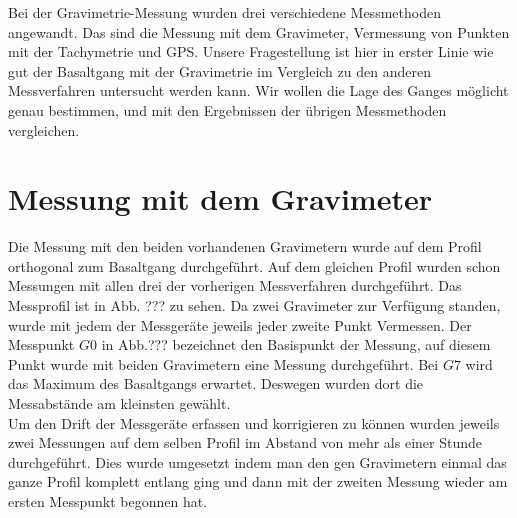 
Bei der Gravimetrie-Messung wurden drei verschiedene Messmethoden angewandt. Das sind die Messung mit dem Gravimeter, Vermessung von Punkten mit der Tachymetrie und GPS.
Unsere Fragestellung ist hier in erster Linie wie gut der Basaltgang mit der Gravimetrie im Vergleich zu den anderen Messverfahren untersucht werden kann.  Wir wollen die Lage des Ganges möglicht genau bestimmen, und mit den 
Ergebnissen der übrigen Messmethoden vergleichen.

\section{Messung mit dem Gravimeter}
Die Messung mit den beiden vorhandenen Gravimetern wurde auf dem Profil orthogonal zum Basaltgang durchgeführt. Auf dem gleichen Profil wurden schon Messungen mit allen drei der vorherigen Messverfahren durchgeführt.
Das Messprofil ist in Abb. ??? zu sehen. Da zwei Gravimeter zur Verfügung standen, wurde mit jedem der Messgeräte jeweils jeder zweite Punkt Vermessen. Der Messpunkt $G0$ in Abb.??? bezeichnet den Basispunkt der Messung, auf
diesem Punkt wurde mit beiden Gravimetern eine Messung durchgeführt. Bei $G7$ wird das Maximum des Basaltgangs erwartet. Deswegen wurden dort die Messabstände am kleinsten gewählt.\\
Um den Drift der Messgeräte erfassen und korrigieren zu können wurden jeweils zwei Messungen auf dem selben Profil im Abstand von mehr als einer Stunde durchgeführt. Dies wurde umgesetzt indem man den gen Gravimetern 
einmal das ganze Profil komplett entlang ging und dann mit der zweiten Messung wieder am ersten Messpunkt begonnen hat.\\  
\\

